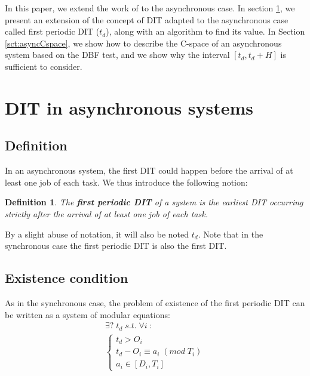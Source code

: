 \documentclass[times, 10pt,twocolumn, a4paper]{article}
\newtheorem{definition}{Definition}
\begin{document}
  In this paper, we extend the work of \cite{george2009characterization} to the asynchronous case. In section \ref{sct:asyncDIT}, we present an extension of the concept of DIT adapted to the asynchronous case called first periodic DIT ($t_d$), along with an algorithm to find its value. In Section \ref{sct:asyncCspace}, we show how to describe the C-space of an asynchronous system based on the DBF test, and we show why the interval $[t_d, t_d + H]$ is sufficient to consider.

\section{DIT in asynchronous systems}
	\label{sct:asyncDIT}

	\subsection{Definition}

		In an asynchronous system, the first DIT could happen before the arrival of at
		least one job of each task. We thus introduce the following notion:

		\begin{definition}
			The \textbf{first periodic DIT} of a system is the earliest DIT occurring
			strictly after the arrival of at least one job of each task.
		\end{definition}

		By a slight abuse of notation, it will also be noted $t_d$. Note that in the
		synchronous case the first periodic DIT is also the first DIT.

	\subsection{Existence condition}
  \label{sct:FPDITexist}
		As in the synchronous case, the problem of existence of the first periodic DIT
		can be written as a system of modular equations:
		\[
			\begin{array}{l}
				\exists ? \; t_d \; s.t. \; \forall i \; :\\
				\left\{
					\begin{array}{l}
						t_d > O_i \\
						t_d - O_i \equiv a_i \; (mod \; T_i) \\
						a_i \in [D_i, T_i]
					\end{array}
				\right.
			\end{array}
		\]
\end{document}
